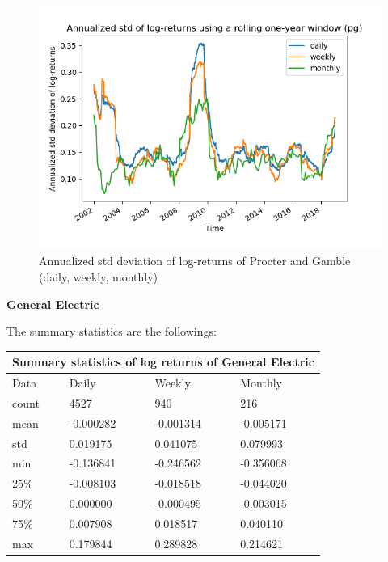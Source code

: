 \documentclass[10pt]{article}
\newenvironment{exercise}[2][Exercise]{\begin{trivlist}
  \item[\hskip \labelsep {\bfseries #1}\hskip \labelsep {\bfseries #2.}]}{\end{trivlist}}
\begin{document}
\begin{exercise}{4}
\begin{figure}[H]
		\centering
		\includegraphics[scale=0.5]{Figures/problem4d_std_pg.png}	
		\caption{Annualized std deviation of log-returns of Procter and Gamble (daily, weekly, monthly)}	
		\label{fig:problem3d_std_pg}
	
	\end{figure}	  
 
	\bigbreak	
		
	\textbf{General Electric}
	
	\smallbreak
	
	The summary statistics are the followings:
	
	\bigbreak	
	
	\begin{tabular}{ |p{3cm}||p{3cm}|p{3cm}|p{3cm}|  }
 		\hline
		\multicolumn{4}{|c|}{Summary statistics of log returns of General Electric} \\
		\hline
		Data & Daily & Weekly & Monthly\\
 		\hline
 		count   &  4527 & 940 & 216\\
 		mean & -0.000282 & -0.001314 & -0.005171\\
 		std & 0.019175 & 0.041075 & 0.079993\\
 		min & -0.136841 & -0.246562 & -0.356068\\
 		25\% &  -0.008103 & -0.018518 & -0.044020\\
 		50\% & 0.000000 & -0.000495 & -0.003015\\
 		75\% & 0.007908 & 0.018517 & 0.040110\\
 		max & 0.179844 & 0.289828 & 0.214621\\
 		\hline
	\end{tabular}
	

\end{exercise}
\end{document}
